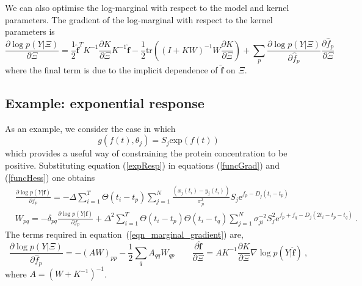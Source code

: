 \documentclass[english]{article}
\begin{document}
We can also optimise the log-marginal with respect to the
model and kernel parameters. The gradient of the log-marginal with
respect to the kernel parameters is~\cite{Rasmussen:book05} 
\begin{equation}
\frac{\partial \log p(Y|\Xi)}{\partial \Xi} = 
\mbox{$\frac{1}{2}$}\hat{\bm f}^T K^{-1}\frac{\partial K}{\partial \Xi} K^{-1}\hat{\bm f} - 
\mbox{$\frac{1}{2}$}\mbox{tr}\left((I+KW)^{-1}W\frac{\partial
  K}{\partial \Xi}\right) + \sum_p \frac{\partial \log p(Y|\Xi)}{\partial \hat{f}_p}\frac{\partial\hat{f}_p}{\partial \Xi}
\label{eqn_marginal_gradient}
\end{equation}
where the final term is due to the implicit dependence of $\hat{\bm f}$ on $\Xi$. 

\subsection{Example: exponential response}
As an example, we consider the case in which 
\begin{equation}
g\left(f\left(t\right),\theta_j\right)=S_j\textrm{exp}\left(f\left(t\right)
\right)
\label{expResp}\end{equation}
which provides a useful way of constraining the protein concentration to be 
positive.
Substituting equation (\ref{expResp}) in equations (\ref{funcGrad}) and 
(\ref{funcHess}) one obtains
\begin{equation*}\begin{split}
&\frac{\partial\log p(Y|\bm f)}{\partial f_p} = -\Delta\sum_{i=1}^T \Theta\left(t_i - t_p\right)\sum_{j=1}^N 
\frac{\left(x_j(t_i) - y_{j}\left(t_i\right)\right)}{\sigma^2_{ji} }S_j \mathrm{e}^{f_p-D_j(t_i-t_p)} \\
&W_{pq} = -\delta_{pq}\frac{\partial\log p(Y|\bm f)}{\partial f_p} + \Delta^2\sum_{i=1}^T 
\Theta\left(t_i-t_p\right)\Theta\left(t_i-t_q\right)\sum_{j=1}^N \sigma_{ji}^{-2} 
S_j^2 \mathrm{e}^{f_p+f_q-D_j(2t_i-t_p-t_q)} \ .
\end{split}\end{equation*}
The terms required in equation~(\ref{eqn_marginal_gradient}) are,
\[
\frac{\partial \log p(Y|\Xi)}{\partial \hat{f}_p} = -(AW)_{pp} - 
\frac{1}{2}\sum_q A_{qq}W_{qp} \qquad \frac{\partial \hat{\bm f}}{\partial \Xi} 
= AK^{-1}\frac{\partial K}{\partial \Xi}\nabla \log p(Y|\hat{\bm f})\ ,
\]
where $A=(W+K^{-1})^{-1}$.
\end{document}

